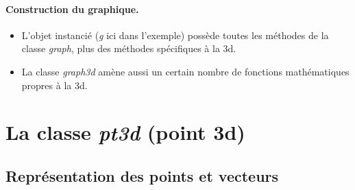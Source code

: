\documentclass[%
10pt,%
a4paper,%
french,%
]%
{article}%
\begin{document}
\paragraph{Construction du graphique.}

\begin{itemize}
    \item L'objet instancié (\emph{g} ici dans l'exemple) possède toutes les méthodes de la classe \emph{graph}, plus des méthodes spécifiques à la 3d.
    \item La classe \emph{graph3d} amène aussi un certain nombre de fonctions mathématiques propres à la 3d.
\end{itemize}


\section{La classe \emph{pt3d} (point 3d)}

\subsection{Représentation des points et vecteurs}
\end{document}
